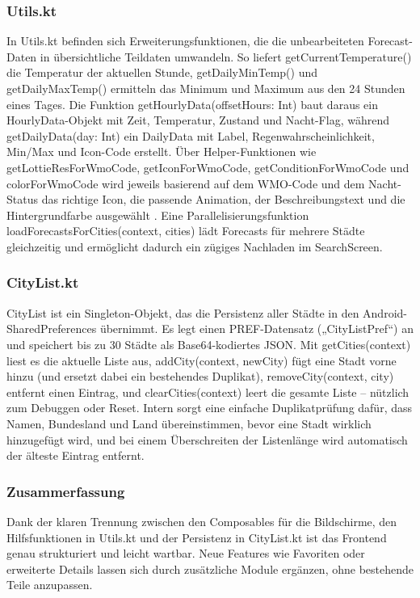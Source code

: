 \documentclass{article}
\begin{document}
\subsubsection{Utils.kt}

In Utils.kt befinden sich Erweiterungsfunktionen, die die unbearbeiteten Forecast-Daten in übersichtliche Teildaten umwandeln. So liefert getCurrentTemperature() die Temperatur der aktuellen Stunde, getDailyMinTemp() und getDailyMaxTemp() ermitteln das Minimum und Maximum aus den 24 Stunden eines Tages. Die Funktion getHourlyData(offsetHours: Int) baut daraus ein HourlyData-Objekt mit Zeit, Temperatur, Zustand und Nacht-Flag, während getDailyData(day: Int) ein DailyData mit Label, Regenwahrscheinlichkeit, Min/Max und Icon-Code erstellt. Über Helper-Funktionen wie getLottieResForWmoCode, getIconForWmoCode, getConditionForWmoCode und colorForWmoCode wird jeweils basierend auf dem WMO-Code und dem Nacht-Status das richtige Icon, die passende Animation, der Beschreibungstext und die Hintergrundfarbe ausgewählt \cite{svgrepo}\cite{lottiefiles}. Eine Parallelisierungsfunktion loadForecastsForCities(context, cities) lädt Forecasts für mehrere Städte gleichzeitig und ermöglicht dadurch ein zügiges Nachladen im SearchScreen.

\subsubsection{CityList.kt}

CityList ist ein Singleton-Objekt, das die Persistenz aller Städte in den Android-SharedPreferences übernimmt. Es legt einen PREF-Datensatz („CityListPref“) an und speichert bis zu 30 Städte als Base64-kodiertes JSON. Mit getCities(context) liest es die aktuelle Liste aus, addCity(context, newCity) fügt eine Stadt vorne hinzu (und ersetzt dabei ein bestehendes Duplikat), removeCity(context, city) entfernt einen Eintrag, und clearCities(context) leert die gesamte Liste – nützlich zum Debuggen oder Reset. Intern sorgt eine einfache Duplikatprüfung dafür, dass Namen, Bundesland und Land übereinstimmen, bevor eine Stadt wirklich hinzugefügt wird, und bei einem Überschreiten der Listenlänge wird automatisch der älteste Eintrag entfernt.

\subsubsection{Zusammerfassung}

Dank der klaren Trennung zwischen den Composables für die Bildschirme, den Hilfsfunktionen in Utils.kt und der Persistenz in CityList.kt ist das Frontend genau strukturiert und leicht wartbar. Neue Features wie Favoriten oder erweiterte Details lassen sich durch zusätzliche Module ergänzen, ohne bestehende Teile anzupassen.
\end{document}
